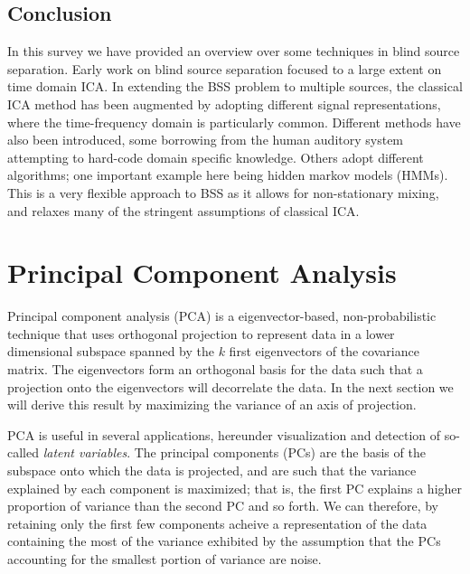 \documentclass[11pt, oneside, a4paper]{report}
\begin{document}
\section{Conclusion}\label{conclusion}

In this survey we have provided an overview over some techniques in
blind source separation. Early work on blind source separation focused
to a large extent on time domain ICA. In extending the BSS problem to
multiple sources, the classical ICA method has been augmented by
adopting different signal representations, where the time-frequency
domain is particularly common. Different methods have also been
introduced, some borrowing from the human auditory system attempting
to hard-code domain specific knowledge. Others adopt different
algorithms; one important example here being hidden markov models
(HMMs). This is a very flexible approach to BSS as it allows for
non-stationary mixing, and relaxes many of the stringent assumptions
of classical ICA. 




\chapter{Principal Component Analysis}\label{pca}

Principal component analysis \cite{pearson1901} (PCA) is a eigenvector-based,
non-probabilistic technique that uses orthogonal projection to
represent data in a lower dimensional subspace spanned by the $k$
first eigenvectors of the covariance matrix. The eigenvectors form an
orthogonal basis for the data such that a projection onto the
eigenvectors will decorrelate the data. In the next section we will
derive this result by maximizing the variance of an axis of
projection.


PCA is useful in several applications, hereunder visualization and
detection of so-called \emph{latent variables}. The principal
components (PCs) are the basis of the subspace onto which the data is
projected, and are such that the variance explained by each component
is maximized; that is, the first PC explains a higher proportion of
variance than the second PC and so forth. We can therefore, by
retaining only the first few components acheive a representation of
the data containing the most of the variance exhibited by the
assumption that the PCs accounting for the smallest portion of
variance are noise.
\end{document}
